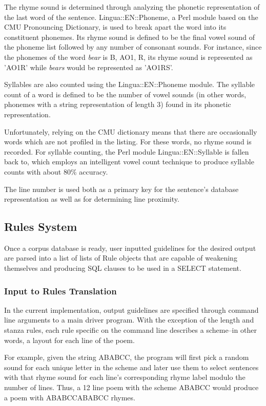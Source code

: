 \documentclass[10pt]{article}
\begin{document}
The rhyme sound is determined through analyzing the phonetic representation of
the last word of the sentence. Lingua::EN::Phoneme, a Perl module based on the
CMU Pronouncing Dictionary, is used to break apart the word into its
constituent phonemes. Its rhyme sound is defined to be the final vowel sound of
the phoneme list followed by any number of consonant sounds. For instance,
since the phonemes of the word \emph{bear} is B, AO1, R, its rhyme sound is
represented as 'AO1R' while \emph{bears} would be represented as 'AO1RS'.

Syllables are also counted using the Lingua::EN::Phoneme module. The syllable
count of a word is defined to be the number of vowel sounds (in other words,
phonemes with a string representation of length 3) found in its phonetic
representation.

Unfortunately, relying on the CMU dictionary means that there are occasionally
words which are not profiled in the listing. For these words, no rhyme sound is
recorded. For syllable counting, the Perl module Lingua::EN::Syllable is fallen
back to, which employs an intelligent vowel count technique to produce syllable
counts with about 80\% accuracy.

The line number is used both as a primary key for the sentence's database
representation as well as for determining line proximity.

\subsection{Rules System}
Once a corpus database is ready, user inputted guidelines for the desired
output are parsed into a list of lists of Rule objects that are capable of
weakening themselves and producing SQL clauses to be used in a SELECT
statement.

\subsubsection{Input to Rules Translation}
In the current implementation, output guidelines are specified through command
line arguments to a main driver program. With the exception of the length and
stanza rules, each rule specific on the command line describes a scheme--in
other words, a layout for each line of the poem.

For example, given the string ABABCC, the program will first pick a random
sound for each unique letter in the scheme and later use them to select
sentences with that rhyme sound for each line's corresponding rhyme label
modulo the number of lines. Thus, a 12 line poem with the scheme ABABCC would
produce a poem with ABABCCABABCC rhymes.
\end{document}
